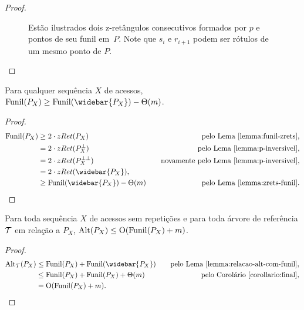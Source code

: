 \begin{proof}
\begin{figure}
    \caption{Estão ilustrados dois z-retângulos consecutivos formados por $p$ e pontos de seu funil em~$P$. Note que $s_i$ e $r_{i+1}$ podem ser rótulos de um mesmo ponto de $P$.}
    \label{fig:funil-2-z-rets}
    \end{figure}
\end{proof}

\begin{corollary} \label{corollario:final} %
    Para qualquer sequência $X$ de acessos, $\Funil(P_X) \geq \Funil(\widebar{P_X}) - \Theta(m)$.
\end{corollary}

\begin{proof}
    \begin{align*}
        \Funil(P_X) &\geq 2 \cdot zRet(P_X) \quad & \text{pelo Lema~\ref{lemma:funil-zrets}}, \\
        &= 2 \cdot zRet(P_X^{\perp}) \quad & \text{pelo Lema~\ref{lemma:p-inversivel}}, \\
        &= 2 \cdot zRet(P_X^{\perp\perp}) \quad & \text{novamente pelo Lema~\ref{lemma:p-inversivel}}, \\
        &= 2 \cdot zRet(\widebar{P_X}), \\
        &\geq \Funil(\widebar{P_X}) - \Theta(m) \quad & \text{pelo Lema~\ref{lemma:zrets-funil}}. \\
    \end{align*}
\end{proof}

\begin{theorem}
    Para toda sequência $X$ de acessos sem repetições e para toda árvore de referência $\mathcal{T}$ em relação a $P_X$, $\mathrm{Alt}(P_X) \leq \mathrm{O}(\mathrm{Funil}(P_X) + m)$.
\end{theorem}

\begin{proof}
    \begin{align*}
        \Alt_{\cT}(P_X) &\leq \Funil(P_X) +  \Funil(\widebar{P_X}) \quad & \text{pelo Lema~\ref{lemma:relacao-alt-com-funil}}, \\
        &\leq \Funil(P_X) +  \Funil(P_X) + \Theta(m) \quad & \text{pelo Corolário~\ref{corollario:final}}, \\
        &= \Oh(\Funil(P_X) + m).
    \end{align*}
\end{proof}

